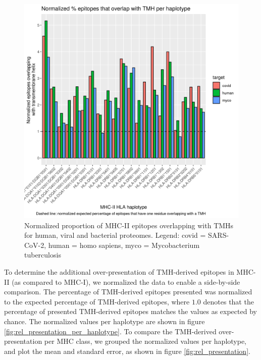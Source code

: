 \begin{figure}[!htbp]
  \includegraphics[width=\textwidth]{bbbq_1_smart_results/fig_f_tmh_mhc2_2_normalized.png}
  \caption{
    Normalized proportion of MHC-II epitopes overlapping with TMHs
    for human, viral and bacterial proteomes.
    Legend: covid = SARS-CoV-2,
    human = homo sapiens, myco = Mycobacterium tuberculosis
  }
  \label{fig:f_tmh_mhc2_normalized}
\end{figure}

To determine the additional over-presentation of TMH-derived epitopes 
in MHC-II (as compared to MHC-I), we normalized the data to enable
a side-by-side comparison. 
The percentage of TMH-derived epitopes presented was normalized
to the expected percentage of TMH-derived epitopes,
where $1.0$ denotes that the percentage of presented TMH-derived epitopes
matches the values as expected by chance.
The normalized values per haplotype are shown 
in figure \ref{fig:rel_presentation_per_haplotype}.
To compare the TMH-derived over-presentation per MHC class,
we grouped the normalized values per haplotype, 
and plot the mean and standard error, as shown in figure \ref{fig:rel_presentation}.

